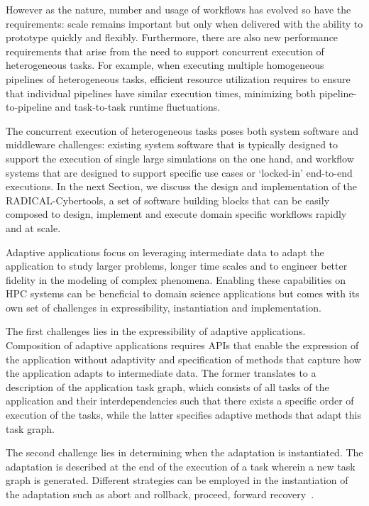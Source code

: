 \documentclass[conference]{IEEEtran}
\begin{document}
However as the nature, number and usage of workflows has evolved so have the
requirements: scale remains important but only when delivered with the
ability to prototype quickly and flexibly. Furthermore, there are also new
performance requirements that arise from the need to support concurrent
execution of heterogeneous tasks. For example, when executing multiple
homogeneous pipelines of heterogeneous tasks, efficient resource utilization
requires to ensure that individual pipelines have similar execution times,
minimizing both pipeline-to-pipeline and task-to-task runtime fluctuations.

The concurrent execution of heterogeneous tasks poses both system software
and middleware challenges: existing system software that is typically
designed to support the execution of single large simulations on the one
hand, and workflow systems that are designed to support specific use cases or
`locked-in' end-to-end executions. In the next Section, we discuss the design
and implementation of the RADICAL-Cybertools, a set of software building
blocks that can be easily composed to design, implement and execute domain
specific workflows rapidly and at scale.

Adaptive applications focus on leveraging intermediate data to adapt the
application to study larger problems, longer time scales and to engineer
better fidelity in the modeling of complex phenomena. Enabling these
capabilities on HPC systems can be beneficial to domain science applications
but comes with its own set of challenges in expressibility, instantiation and
implementation.

The first challenges lies in the expressibility of adaptive applications.
Composition of adaptive applications requires APIs that enable the expression
of the application without adaptivity and specification of methods that
capture how the application adapts to intermediate data. The former
translates to a description of the application task graph, which consists of
all tasks of the application and their interdependencies such that there
exists a specific order of execution of the tasks, while the latter specifies
adaptive methods that adapt this task graph.

The second challenge lies in determining when the adaptation is instantiated.
The adaptation is described at the end of the execution of a task wherein a
new task graph is generated. Different strategies can be employed in the
instantiation of the adaptation such as abort and rollback, proceed, forward
recovery~\cite{van2000dealing}.
\end{document}
